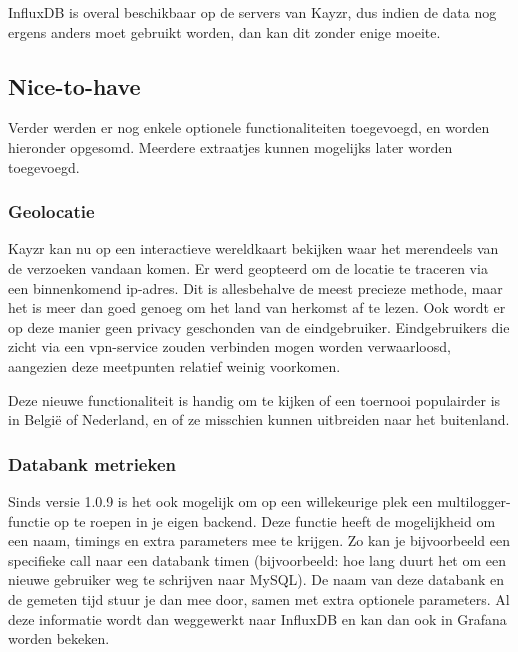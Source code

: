 InfluxDB is overal beschikbaar op de servers van Kayzr, dus indien de data nog ergens anders moet gebruikt worden, dan kan dit zonder enige moeite.

\subsection{Nice-to-have}
\label{sec:nicetohave}

Verder werden er nog enkele optionele functionaliteiten toegevoegd, en worden hieronder opgesomd. Meerdere extraatjes kunnen mogelijks later worden toegevoegd.

\subsubsection{Geolocatie}
\label{sec:geolocation}

Kayzr kan nu op een interactieve wereldkaart bekijken waar het merendeels van de verzoeken vandaan komen. Er werd geopteerd om de locatie te traceren via een binnenkomend ip-adres. Dit is allesbehalve de meest precieze methode, maar het is meer dan goed genoeg om het land van herkomst af te lezen. Ook wordt er op deze manier geen privacy geschonden van de eindgebruiker. Eindgebruikers die zicht via een vpn-service zouden verbinden mogen worden verwaarloosd, aangezien deze meetpunten relatief weinig voorkomen.

Deze nieuwe functionaliteit is handig om te kijken of een toernooi populairder is in België of Nederland, en of ze misschien kunnen uitbreiden naar het buitenland.

\subsubsection{Databank metrieken}
\label{sec:databaseMetrics}

Sinds versie 1.0.9 is het ook mogelijk om op een willekeurige plek een multilogger-functie op te roepen in je eigen backend. Deze functie heeft de mogelijkheid om een naam, timings en extra parameters mee te krijgen. Zo kan je bijvoorbeeld een specifieke call naar een databank timen (bijvoorbeeld: hoe lang duurt het om een nieuwe gebruiker weg te schrijven naar MySQL). De naam van deze databank en de gemeten tijd stuur je dan mee door, samen met extra optionele parameters. Al deze informatie wordt dan weggewerkt naar InfluxDB en kan dan ook in Grafana worden bekeken. 

